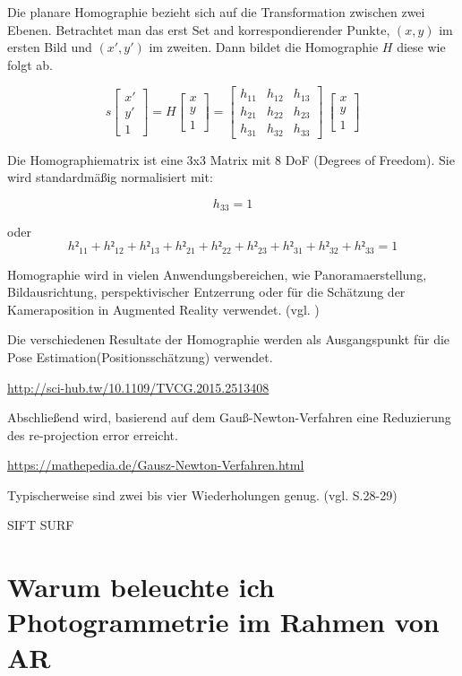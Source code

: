 Die planare Homographie bezieht sich auf die Transformation zwischen zwei Ebenen. Betrachtet man das erst Set and korrespondierender Punkte, $(x,y)$ im ersten Bild und $(x',y')$ im zweiten. Dann bildet die Homographie $H$ diese wie folgt ab.

\begin{equation}
  s  
  		\begin{bmatrix}
		x'\\
		y'\\
		1
     	\end{bmatrix}
     = H
     	\begin{bmatrix}
		x\\
		y\\
		1
     	\end{bmatrix}
      = 
     	\begin{bmatrix}
		h_11 & h_12 & h_13\\
		h_21 & h_22 & h_23\\
		h_31 & h_32 & h_33
     	\end{bmatrix}
      \
     	\begin{bmatrix}
		x\\
		y\\
		1
     	\end{bmatrix}
\end{equation}

Die Homographiematrix ist eine 3x3 Matrix mit 8 DoF (Degrees of Freedom). Sie wird standardmäßig normalisiert mit: 

\begin{equation}
h_33 = 1
\end{equation}

oder 
\begin{equation}
h²_{11} + h²_{12} + h²_{13} + h²_{21} + h²_{22} + h²_{23} + h²_{31} + h²_{32} + h²_{33} = 1
\end{equation}

Homographie wird in vielen Anwendungsbereichen, wie Panoramaerstellung, Bildausrichtung, perspektivischer Entzerrung oder für die Schätzung der Kameraposition in Augmented Reality verwendet. (vgl. \cite{homography})

Die verschiedenen Resultate der Homographie werden als Ausgangspunkt für die \glqq Pose Estimation\grqq (Positionsschätzung) verwendet.

\url{http://sci-hub.tw/10.1109/TVCG.2015.2513408}

 Abschließend wird, basierend auf dem Gauß-Newton-Verfahren eine Reduzierung des \glqq re-projection error\grqq{} erreicht. 
 
\url{https://mathepedia.de/Gausz-Newton-Verfahren.html} 
 
 Typischerweise sind zwei bis vier Wiederholungen genug. (vgl. \cite{natural_feature} S.28-29)


SIFT
SURF

\section{Warum beleuchte ich Photogrammetrie im Rahmen von AR}